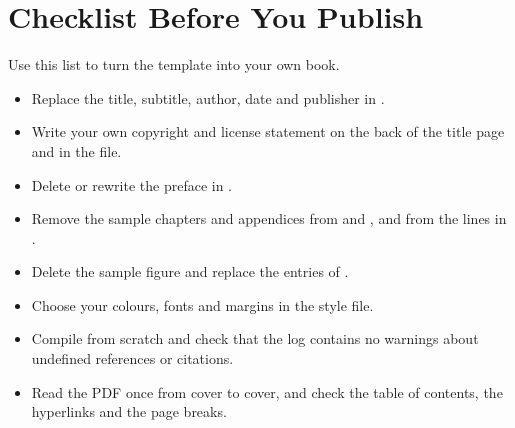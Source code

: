 \chapter{Checklist Before You Publish}\label{app:checklist}

Use this list to turn the template into your own book.

\begin{itemize}[label=$\square$]
  \item Replace the title, subtitle, author, date and publisher in
        .
  \item Write your own copyright and license statement on the back of the
        title page and in the  file.
  \item Delete or rewrite the preface in .
  \item Remove the sample chapters and appendices from  and
        , and from the  lines in .
  \item Delete the sample figure and replace the entries of
        .
  \item Choose your colours, fonts and margins in the style file.
  \item Compile from scratch and check that the log contains no warnings about
        undefined references or citations.
  \item Read the PDF once from cover to cover, and check the table of
        contents, the hyperlinks and the page breaks.
\end{itemize}
